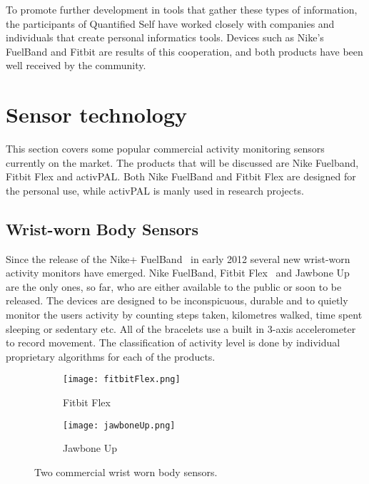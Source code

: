 To promote further development in tools that gather these types of information, the participants of Quantified Self have worked closely with companies and individuals that create personal informatics tools. Devices such as Nike's FuelBand and Fitbit are results of this cooperation, and both products have been well received by the community.

\section{Sensor technology}
This section covers some popular commercial activity monitoring sensors currently on the market. The products that will be discussed are Nike Fuelband, Fitbit Flex and activPAL. Both Nike FuelBand and Fitbit Flex are designed for the personal use, while activPAL is manly used in research projects.

\subsection{Wrist-worn Body Sensors}
Since the release of the Nike+ FuelBand~\cite{fuelBand} in early 2012 several new wrist-worn activity monitors have emerged. Nike FuelBand, Fitbit Flex~\cite{flex} and Jawbone Up~\cite{jawboneUp} are the only ones, so far, who are either available to the public or soon to be released. The devices are designed to be inconspicuous, durable and to quietly monitor the users activity by counting steps taken, kilometres walked, time spent sleeping or sedentary etc. All of the bracelets use a built in 3-axis accelerometer to record movement. The classification of activity level is done by individual proprietary algorithms for each of the products.

\begin{figure}[h!]
  \centering
  \begin{subfigure}[b]{0.3\textwidth}
    \centering
    \texttt{[image: fitbitFlex.png]}
    \caption{Fitbit Flex}
    \label{fig:fitbitFlex}
  \end{subfigure}
  \begin{subfigure}[b]{0.4\textwidth}
    \centering
    \texttt{[image: jawboneUp.png]}
    \caption{Jawbone Up}
    \label{fig:jawboneUp}
  \end{subfigure}
  \caption[Fitbit Flex and Jawbone Up]{Two commercial wrist worn body sensors.}
\end{figure}

